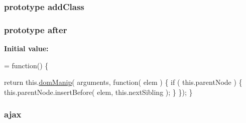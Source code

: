 \subsubsection[{add\+Class}]{ {\bf prototype} add\+Class}\label{jquery-1_810_82-vsdoc_8js_ac98f6924e42def59f1eb8d3ea1892a8e}
\hypertarget{jquery-1_810_82-vsdoc_8js_a80413815f48b2c1f574e33fd8a7c3896}{}
\subsubsection[{after}]{ {\bf prototype} after}\label{jquery-1_810_82-vsdoc_8js_a80413815f48b2c1f574e33fd8a7c3896}
{\bfseries Initial value\+:}
\begin{DoxyCode}
= \textcolor{keyword}{function}() \{


        \textcolor{keywordflow}{return} this.\hyperlink{jquery-1_810_82-vsdoc_8js_a00a63bd312ef048290dc1755ccb8bae4}{domManip}( arguments, \textcolor{keyword}{function}( elem ) \{
            \textcolor{keywordflow}{if} ( this.parentNode ) \{
                this.parentNode.insertBefore( elem, this.nextSibling );
            \}
        \});
    \}
\end{DoxyCode}
\hypertarget{jquery-1_810_82-vsdoc_8js_a3c9e2ac71a76356869090140308936dc}{}
\subsubsection[{ajax}]{ ajax}\label{jquery-1_810_82-vsdoc_8js_a3c9e2ac71a76356869090140308936dc}
\hypertarget{jquery-1_810_82-vsdoc_8js_ab4777151692b2525369c42a5f056725e}{}
